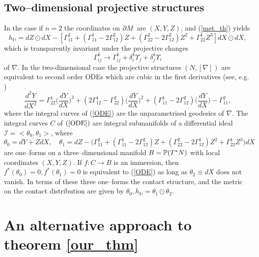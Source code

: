 \koniec

\subsection{Two--dimensional projective structures}
In the case if $n=2$ the coordinates on $\partial M$ are $(X, Y, Z)$,  and (\ref{met_th}) yields
\[
h_{ \mathbb{H} }=dZ\odot dX-[\Gamma_{11}^2+(\Gamma_{11}^1-2\Gamma_{12}^2)Z+(\Gamma_{22}^2-2\Gamma_{12}^2)Z^2+
\Gamma_{22}^1Z^3]dX\odot dX,
\]
which is transparently invariant under the projective changes 
\[
\Gamma_{ij}^k\longrightarrow \Gamma_{ij}^k+\delta^k_i\Upsilon_j+\delta^k_j\Upsilon_i
\]
of $\nabla$.
In the  two-dimensional case the 
projective
structures $(N, [\nabla])$ are equivalent to second order ODEs which are cubic in
the first derivatives (see, e.g. \cite{BDE})
\begin{equation}
\label{ODE}
\frac{d^2 Y}{d X^2}=\Gamma^1_{22}\Big(\frac{d Y}{d X}\Big)^3
+(2\Gamma^1_{12}-\Gamma^2_{22})\Big(\frac{d Y}{d X}\Big)^2
+(\Gamma^1_{11}-2\Gamma^2_{12})\Big(\frac{d Y}{d X}\Big)-
\Gamma^2_{11},
\end{equation}
where the integral curves of (\ref{ODE}) are the unparametrised geodesics of $\nabla$. 
The integral curves $C$ of $(\ref{ODE})$ are integral submanifolds
of a  differential
ideal ${\mathcal I}=<\theta_0, \theta_1>$, where
\[
\theta_0=dY+ZdX, \quad \theta_1=dZ-\Big(\Gamma_{11}^2+(\Gamma_{11}^1-2\Gamma_{12}^2)Z+(\Gamma_{22}^2-2\Gamma_{12}^1)Z^2+
\Gamma_{22}^1Z^3\Big)dX
\]
are one--forms on a three--dimensional manifold $B=\mathbb{P}(T^*N)$ with local coordinates $(X, Y, Z)$. If $f:C\rightarrow B$ is an immersion, then $f^*(\theta_0)=0, f^*(\theta_1)=0$ is equivalent
to (\ref{ODE}) as long as $\theta_2\equiv dX$ does not vanish. In terms of these three one--forms
the contact structure, and the metric on the contact distribution are given by
$
\theta_0,  h_{ \mathbb{H} }=\theta_1\odot\theta_2.
$

\section{An alternative approach to theorem \ref{our_thm}}


